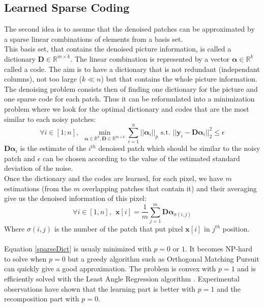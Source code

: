 \documentclass{ipol}
\newcommand{\psize}{m}
\newcommand{\dsize}{k}
\newcommand{\dict}{\textbf{D}}
\newcommand{\code}{\bm{\alpha}}
\newcommand{\pnorm}{p}
\newcommand{\denoi}{\textbf{x}}
\newcommand{\noi}{\textbf{y}}
\newcommand{\RR}{\mathbb{R}}
\begin{document}
\subsection{ Learned Sparse Coding}

The second idea is to assume that the denoised patches can be approximated by a sparse linear combinations of elements from a basis set.\\
This basis set, that contains the denoised picture information, is called a dictionary $\dict \in \RR^{\psize \times \dsize}$. The linear combination is represented by a vector $\code \in \RR^{\dsize}$ called a code.
The aim is to have a dictionary that is not redundant (independant columns), not too large ($\dsize \ll n$) but that contains the whole picture information.\\
The denoising problem consists then of finding one dictionary for the picture and one sparse code for each patch. Thus it can be reformulated into a minimization problem where we look for the optimal dictionary and codes that are the most similar to each noisy patches:
\begin{equation}
	\forall i \in [1;n], \ \ \min_{\code\in \RR^\dsize, \dict \in \RR^{\psize \times \dsize}} \sum_{i=1}^{n} ||\code_i||_\pnorm \text{ s.t. } ||\noi_i  - \dict \code_i||^2_2 \leqslant \epsilon
	\label{sparseDict}
\end{equation}
$\dict \code_i$ is the estimate of the $i^{th}$ denoised patch which should be similar to the noisy patch and $\epsilon$ can be chosen according to the value of the estimated standard deviation of the noise.\\
Once the dictionary and the codes are learned, for each pixel, we have $\psize$ estimations (from the $\psize$ overlapping patches that contain it) and their averaging give us the denoised information of this pixel:
\begin{equation}
	\forall i \in [1,n], \ \ \denoi[i] = \frac{1}{\psize} \sum_{j=1}^\psize \dict \code_{\sigma(i,j)}
\end{equation}
Where $\sigma(i,j)$ is the number of the patch that put pixel $\denoi[i]$ in $j^{th}$ position.\\
\\
Equation \eqref{sparseDict} is usualy minimized with $\pnorm = 0$ or $1$. It becomes NP-hard to solve when $\pnorm=0$ but a greedy algorithm such as Orthogonal Matching Pursuit \cite{OMP} can quickly give a good approximation. The problem is convex with $\pnorm=1$ and is efficiently solved with the Least Angle Regression algorithm \cite{LARS}. Experimental observations \cite{l0l1} have shown that the learning part is better with $\pnorm=1$ and the recomposition part with $\pnorm=0$.\\
\end{document}
